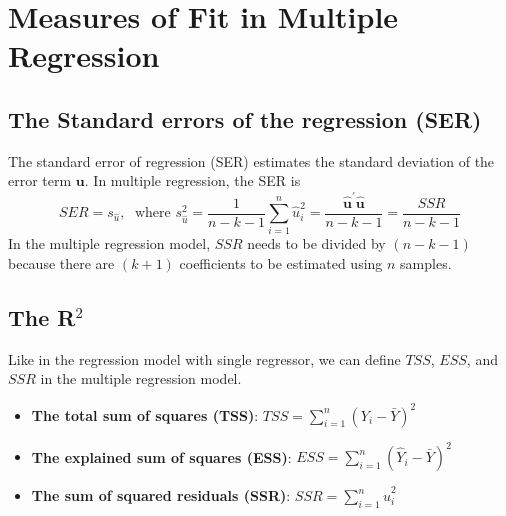 \documentclass[a4paper,11pt]{article}
\begin{document}
\section{Measures of Fit in Multiple Regression}
\label{sec:org74bdc40}
\subsection{The Standard errors of the regression (SER)}
\label{sec:org89d86fd}
The standard error
of regression (SER) estimates the standard deviation of the error term
\(\mathbf{u}\). In multiple regression, the SER is
\begin{equation}
\label{eq:ser-m}
SER = s_{\hat{u}},\; \text{ where } s^2_{\hat{u}} = \frac{1}{n-k-1} \sum_{i=1}^n \hat{u}_i^2 =\frac{\mathbf{\hat{u}}^{\prime} \mathbf{\hat{u}}}{n-k-1} = \frac{SSR}{n-k-1}
\end{equation}
In the multiple regression model, \(SSR\) needs to be divided by
\((n-k-1)\) because there are \((k+1)\) coefficients to be estimated using
\(n\) samples.

\subsection{The R\(^{\text{2}}\)}
\label{sec:orgab88d53}
Like in the regression model with single regressor, we can define
\(TSS\), \(ESS\), and \(SSR\) in the multiple regression model.

\begin{itemize}
\item \textbf{The total sum of squares (TSS)}: \(TSS = \sum_{i=1}^n (Y_i - \bar{Y})^2\)
\item \textbf{The explained sum of squares (ESS)}: \(ESS = \sum_{i=1}^n (\hat{Y}_i - \bar{Y})^2\)
\item \textbf{The sum of squared residuals (SSR)}: \(SSR = \sum_{i=1}^n \hat{u}_i^2\)
\end{itemize}
\end{document}
